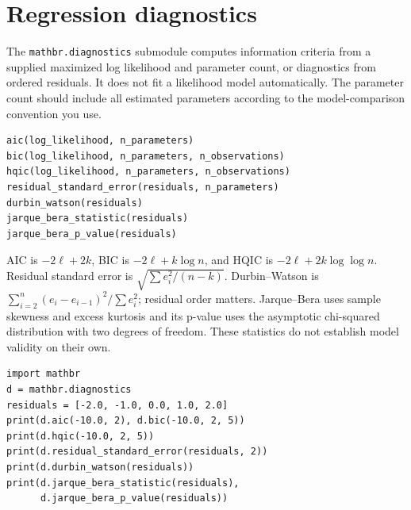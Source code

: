 \documentclass[11pt,a4paper]{article}
\begin{document}
\section{Regression diagnostics}
The \verb|mathbr.diagnostics| submodule computes information criteria from a supplied maximized log likelihood and parameter count, or diagnostics from ordered residuals. It does not fit a likelihood model automatically. The parameter count should include all estimated parameters according to the model-comparison convention you use.
\begin{verbatim}
aic(log_likelihood, n_parameters)
bic(log_likelihood, n_parameters, n_observations)
hqic(log_likelihood, n_parameters, n_observations)
residual_standard_error(residuals, n_parameters)
durbin_watson(residuals)
jarque_bera_statistic(residuals)
jarque_bera_p_value(residuals)
\end{verbatim}
AIC is $-2\ell+2k$, BIC is $-2\ell+k\log n$, and HQIC is $-2\ell+2k\log\log n$. Residual standard error is $\sqrt{\sum e_i^2/(n-k)}$. Durbin--Watson is $\sum_{i=2}^n(e_i-e_{i-1})^2/\sum e_i^2$; residual order matters. Jarque--Bera uses sample skewness and excess kurtosis and its p-value uses the asymptotic chi-squared distribution with two degrees of freedom. These statistics do not establish model validity on their own.
\begin{verbatim}
import mathbr
d = mathbr.diagnostics
residuals = [-2.0, -1.0, 0.0, 1.0, 2.0]
print(d.aic(-10.0, 2), d.bic(-10.0, 2, 5))
print(d.hqic(-10.0, 2, 5))
print(d.residual_standard_error(residuals, 2))
print(d.durbin_watson(residuals))
print(d.jarque_bera_statistic(residuals),
      d.jarque_bera_p_value(residuals))
\end{verbatim}
\end{document}
